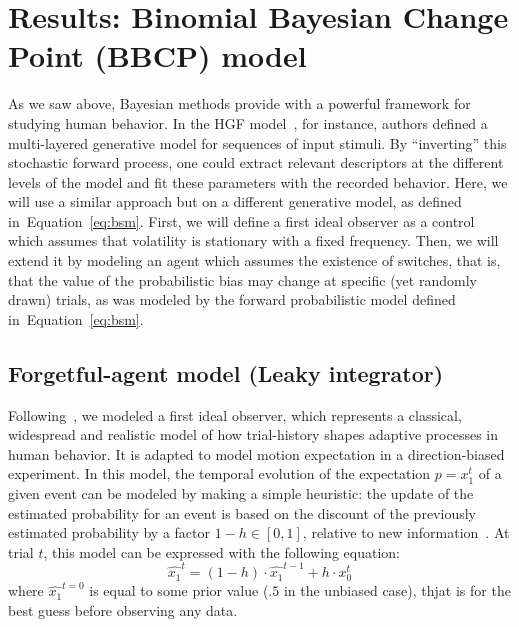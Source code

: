 \documentclass[12pt,english]{article}%
\newcommand{\eql}[1]{\begin{equation}#1\end{equation}}
\newcommand{\citep}[1]{\parencite{#1}}
\newcommand{\citet}[1]{\textcite{#1}}
\newcommand{\seeEq}[1]{Equation~\ref{eq:#1}}
\begin{document}
\section{Results: Binomial Bayesian Change Point (BBCP) model}
\label{sec:bayesian_change_point}
%
%
As we saw above, Bayesian methods provide with
a powerful framework for studying human behavior.
In the HGF model~\citep{Mathys11}, for instance,
authors defined a multi-layered generative model for
sequences of input stimuli.
By ``inverting'' this stochastic forward process,
one could extract relevant descriptors at the different levels of the model
and fit these parameters with the recorded behavior.
Here, we will use a similar approach but on a different generative model,
as defined in~\seeEq{bsm}.
First, we will define a first ideal observer as a control
which assumes that volatility is stationary with a fixed frequency.
Then, we will extend it by modeling an agent
which assumes the existence of switches, that is,
that the value of the probabilistic bias may change
at specific (yet randomly drawn) trials,
as was modeled by the forward probabilistic model defined in~\seeEq{bsm}.
%
\subsection{Forgetful-agent model (Leaky integrator)}%
Following~\citet{Maus2015},
we modeled a first ideal observer,
which represents a classical, widespread and
realistic model of how trial-history shapes
adaptive processes in human behavior.
It is adapted to model motion expectation in a direction-biased experiment.
In this model, the temporal evolution of the expectation $p=x_1^t$ of a given event
can be modeled by making a simple heuristic:
the update of the estimated probability for an event is based
on the discount of the previously estimated probability
by a factor $1 - h \in [0, 1]$, relative to new information~\citet{Anderson2006}.
At trial $t$, this model can be expressed with the following equation:
\eql{
\hat{x_1}^{t} = (1 - h) \cdot \hat{x_1}^{t-1} + h \cdot x_0^t
\label{eq:leaky}}
where $\hat{x_1}^{t=0}$ is equal to some prior value ($.5$ in the unbiased case),
thjat is for the best guess before observing any data.
\end{document}

